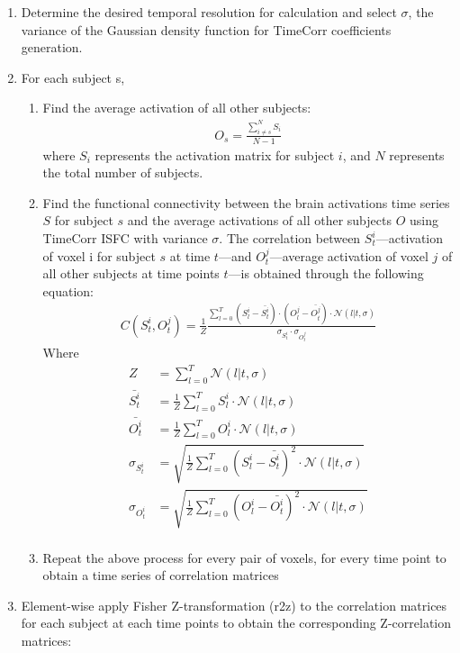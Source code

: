 \documentclass[11pt]{article}
\begin{document}
\begin{enumerate}
\item Determine the desired temporal resolution for calculation and select $\sigma$, the variance of the Gaussian density function for TimeCorr coefficients generation.
\item For each subject s,
\begin{enumerate}
\item Find the average activation of all other subjects:
\begin{align*}
O_s=\frac{\sum_{i\neq s}^N S_i}{N-1}
\end{align*}
where $S_i$ represents the activation matrix for subject $i$, and $N$ represents the total number of subjects.
\item Find the functional connectivity between the brain activations time series $S$ for subject $s$ and the average activations of all other subjects $O$ using TimeCorr ISFC with variance $\sigma$. The correlation between $S^i_t$---activation of voxel i for subject $s$ at time $t$---and $O^j_t$---average activation of voxel $j$ of all other subjects at time points $t$---is obtained through the following equation:
\begin{align*}
C(S^i_t,O^j_t) = \frac{1}{Z}\frac{\sum_{l=0}^T (S_l^i - \bar{S^i_t})\cdot(O^j_l - \bar{O^j_t})\cdot \mathcal{N}(l|t,\sigma)}{\sigma_{S_t^i} \cdot \sigma_{O_t^j}}
\end{align*}
Where
\begin{align*}
Z &= \sum_{l=0}^T \mathcal{N}(l|t,\sigma)\\
\bar{S^i_t} &=\frac{1}{Z} \sum_{l=0}^T S^i_l \cdot \mathcal{N}(l|t,\sigma)\\
\bar{O^i_t} &=\frac{1}{Z} \sum_{l=0}^T O^i_l \cdot \mathcal{N}(l|t,\sigma)\\
\sigma_{S_t^i} &=\sqrt{ \frac{1}{Z}\sum_{l=0}^T (S_l^i-\bar{S_t^i})^2 \cdot \mathcal{N}(l|t,\sigma)}\\
\sigma_{O_t^i} &=\sqrt{ \frac{1}{Z}\sum_{l=0}^T (O_l^i-\bar{O_t^i})^2 \cdot \mathcal{N}(l|t,\sigma)}\\
\end{align*}
\item Repeat the above process for every pair of voxels, for every time point to obtain a time series of correlation matrices
\end{enumerate}
\item Element-wise apply Fisher Z-transformation (r2z) to the correlation matrices for each subject at each time points to obtain the corresponding Z-correlation matrices:

\end{enumerate}
\end{document}
